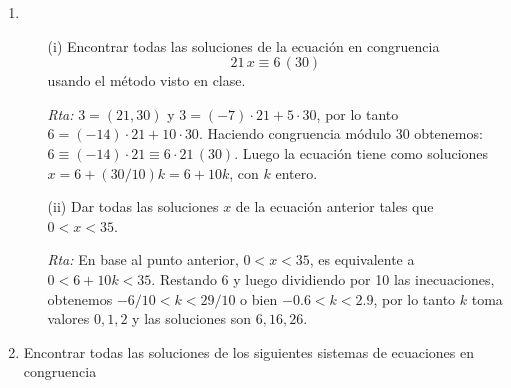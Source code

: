 \documentclass[12pt,spanish,makeidx]{amsbook}
\newcommand{\rta}{\noindent\textit{Rta: }}
\newcommand{\alt}{\noindent\textit{Rta alternativa: }}
\newcommand{\md}[1]{{\,}\left(#1\right)}
\begin{document}
\begin{enumerate}
\begin{enumerate}
		
		
		\item[(ii)] Dar todas las soluciones $x$ de la ecuación anterior tales que $-8 < x < 30$.	
		
		\rta  Como todas las soluciones son de la forma  $x = -2 +5k$, con $k$ entero, tomamos valores consecutivos de $k$ y observamos cuando $x=-2 +5k$ se encuentra en el rango  $-8 < x < 30$. Si  empezamos por $k=-3$, la solución es $x=-17$ y  las soluciones para ese $k$ y los siguientes son
		\begin{equation*}
			-17, -12, -7, -2, 3, 8, 13, 18, 23, 28, 33 
		\end{equation*}
		Por lo tanto la respuesta es $-7, -2, 3, 8, 13, 18, 23, 28$.
		
		 \alt Si queremos ser más sistemáticos planteamos las inecuaciones $-8 < -2 +5k < 30$. Sumando 2 y dividiendo por 5 en las inecuaciones, obtenemos $-6/5 < k < 32/5$ o equivalentemente $-1.2 < k < 6.4$, es decir que $k$ debe tomar los valores $-1, 0,1,2,3,4,5,6$ y por lo tanto $x = -2 +5k$ toma valores $-7, -2, 3, 8, 13, 18, 23, 28$.
		
	\end{enumerate}
	
	
	\smallskip
	\item 
	\begin{enumerate}
		\item[(i)] Encontrar todas las soluciones de la ecuación en congruencia
		$$21\,x\equiv 6 \md{30}$$
		usando el método visto en clase.
			
		\rta  $3=(21,30)$ y $3 = (-7)\cdot 21 + 5 \cdot 30$, por lo tanto $6 = (-14)\cdot 21 + 10 \cdot 30$. Haciendo congruencia módulo $30$ obtenemos: $6 \equiv (-14)\cdot 21\equiv 6\cdot 21 \md{30}$. Luego la ecuación  tiene como soluciones $x=6+(30/10)k= 6+ 10k$, con $k$ entero.
		
		\item[(ii)] Dar todas las soluciones $x$ de la ecuación anterior tales que $0 < x < 35$.
			
		\rta En base al punto anterior, $0 < x < 35$, es equivalente a $0 < 6 +10k < 35$. Restando 6 y luego dividiendo por 10 las inecuaciones, obtenemos $-6/10 < k < 29/10$ o bien $-0.6 < k < 2.9$, por lo tanto $k $ toma valores $0, 1,2$ y las soluciones son $6, 16, 26$.
		
	\end{enumerate}
	
	
	\smallskip
	\item Encontrar todas las soluciones de los siguientes sistemas de ecuaciones en congruencia 
	

\end{enumerate}
\end{document}
